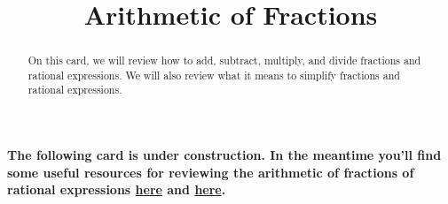 \documentclass{ximera}
\title[Dig-In:]{Arithmetic of Fractions}
\begin{document}
\begin{abstract}
On this card, we will review how to add, subtract, multiply, and divide fractions and rational expressions.  We will also review what it means to simplify fractions and rational expressions.
\end{abstract}
\maketitle

\textbf{The following card is under construction.  In the meantime you'll find some useful resources for reviewing the arithmetic of fractions of rational expressions \href{https://www.khanacademy.org/math/arithmetic/fraction-arithmetic}{here} and \href{https://www.khanacademy.org/math/algebra2/rational-expressions-equations-and-functions}{here}.}
\end{document}
